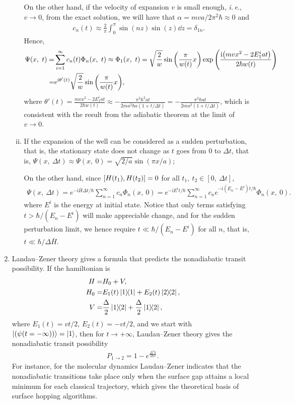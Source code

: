 \documentclass{article}
\newcommand{\iu}{\ensuremath{\mathrm{i}}}
\begin{document}
\begin{enumerate}[1.]
\begin{enumerate}[(i)]
    On the other hand, if the velocity of expansion $v$ is small enough, \emph{i.\,e.}, $v \to 0$, from the exact solution, we will have that $\alpha = mva/2\pi^2\hbar \approx 0$ and
    \begin{align*}
      c_n(t) \approx \frac{2}{\pi}\int_0^\pi \sin(nz)\sin(z)\dd{z} = \delta_{1n}.
    \end{align*} 
    Hence,
    \begin{align*}
      \Psi(x,\ t) =& \sum_{i=1}^\infty c_n(t)\Phi_n(x,\ t) \approx \Phi_1(x,\ t) =  \sqrt{\frac{2}{w}}\sin\qty(\frac{\pi}{w(t)}x)\exp\qty(\frac{\iu\qty(mvx^2 - 2E_1^iat)}{2\hbar w(t)})
      \\ =&  e^{\iu\theta'(t)} \sqrt{\frac{2}{w}}\sin\qty(\frac{\pi}{w(t)}x),
    \end{align*}
    where $\theta'(t) = \frac{mvx^2 - 2E_1^iat}{2\hbar w(t)} \approx - \frac{\pi^2\hbar^2at}{2ma^2\hbar a(1 + t/\Delta t)} = -\frac{\pi^2\hbar a t}{2ma^2 (1 + t/\Delta t)}$, which is consistent with the result from the adiabatic theorem at the limit of $v \to 0$.
    \item If the expansion of the well can be considered as a sudden perturbation, that is, the stationary state does not change as $t$ goes from $0$ to $\Delta t$, that is, $\Psi(x,\ \Delta t) \approx \Psi(x,\ 0) = \sqrt{2/a}\sin(\pi x / a)$;
    
    On the other hand, since $\comm{H(t_1)}{H(t_2)} = 0$ for all $t_1,\ t_2 \in [0,\ \Delta t]$,
    \begin{align*}
      \Psi(x,\ \Delta t) = e^{-\iu \bar{H} \Delta t/\hbar} \sum_{n=1}^\infty c_n \Phi_n (x,\ 0) = e^{-\iu E^i t/\hbar}\sum_{n=1}^\infty c_n e^{-\iu(E_n - E^i)t/\hbar} \Phi_n (x,\ 0).
    \end{align*} 
    where $E^i$ is the energy at initial state. Notice that only terms satisfying $t > \hbar/(E_n - E^i)$ will make appreciable change, and for the sudden perturbation limit, we hence require $t \ll \hbar/(E_n - E^i)$ for all $n$, that is, $t \ll \hbar/\Delta \bar{H}$.
  \end{enumerate}

  \item Landau--Zener theory gives a formula that predicts the nonadiabatic transit possibility. If the hamiltonian is
  \begin{align*}
    H =& H_0 + V, \\
    H_0 =& E_1(t)\op{1} + E_2(t)\op{2}, \\
    V =& \frac{\Delta}{2}\op{1}{2} + \frac{\Delta}{2}\op{1}{2},
  \end{align*}
  where $E_1(t) = vt/2$, $E_2(t) = -vt/2$,  and we start with $\ket{(\psi(t=-\infty))} = \ket{1}$, then for $t \to +\infty$, Laudau--Zener theory gives the nonadiabatic transit possibility
  \begin{align*}
    P_{1\to 2} = 1-e^{\frac{\Delta^2\pi}{2\hbar v}}.
  \end{align*}
  For instance, for the molecular dynamics Laudau--Zener indicates that the nonadiabatic transitions take place only when the surface gap attains a local minimum for each classical trajectory, which gives the theoretical basis of surface hopping algorithms.


\end{enumerate}
\end{document}
